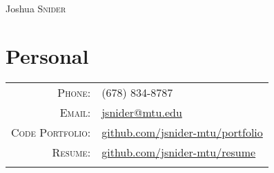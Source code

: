 \documentclass[a4paper,9pt]{extarticle}
\begin{document}
\pagestyle{empty}

\par{\centering
                {\Huge Joshua \textsc{Snider}
        }\bigskip\par}
\section{Personal}
\begin{tabular}{rl}
    \textsc{Phone:}          & (678) 834-8787\\
    \textsc{Email:}          & \href{mailto:jsnider@mtu.edu}{jsnider@mtu.edu}\\
    \textsc{Code Portfolio:} & \href{https://github.com/jsnider-mtu/portfolio}{github.com/jsnider-mtu/portfolio}\\
    \textsc{Resume:}         & \href{https://github.com/jsnider-mtu/resume}{github.com/jsnider-mtu/resume}\\
    \multicolumn{2}{c}{}\\
\end{tabular}
\end{document}
